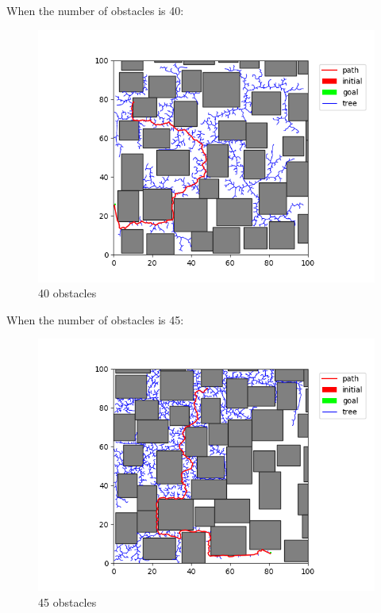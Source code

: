 \documentclass[12pt,a4paper]{article}
\begin{document}
When the number of obstacles is 40:
\begin{figure}[H]
\centering

\includegraphics[scale=.45]{40.png}
\caption{40 obstacles}
\end{figure}
When the number of obstacles is 45:
\begin{figure}[H]
\centering

\includegraphics[scale=.45]{45.png}
\caption{45 obstacles}
\end{figure}
\end{document}
